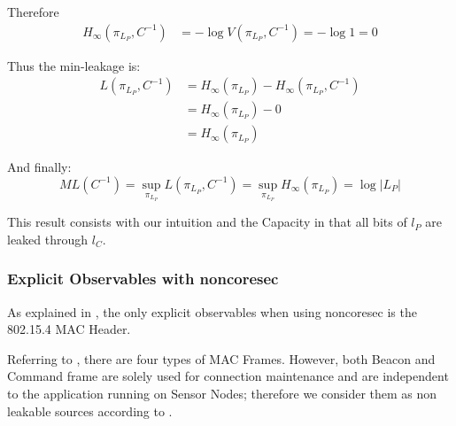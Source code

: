 Therefore
\begin{equation}
	\begin{aligned}
		H_{\infty}(\pi_{L_{P}}, C^{-1})
		 &= - \log{V(\pi_{L_{P}}, C^{-1})} = - \log1= 0
	\end{aligned}
\end{equation}

Thus the min-leakage is:
\begin{equation}
	\begin{aligned}
	L(\pi_{L_P}, C^{-1}) 
	 &= H_{\infty}(\pi_{L_P}) - H_{\infty}(\pi_{L_{P}}, C^{-1}) \\
	 &= H_{\infty}(\pi_{L_P}) - 0 \\
	 &= H_{\infty}(\pi_{L_P})
	\end{aligned}
\end{equation}

And finally:
\begin{equation}
	ML(C^{-1}) = \sup_{\pi_{L_P}}{L(\pi_{L_P},C^{-1})} =  \sup_{\pi_{L_P}} H_{\infty}(\pi_{L_P}) = \log{|L_P|}
\end{equation}

This result consists with our intuition and the Capacity in  that all bits of $l_P$ are leaked through $l_C$.

\subsubsection{Explicit Observables with noncoresec}

As explained in , the only explicit observables when using noncoresec is the 802.15.4 MAC Header. 

Referring to , there are four types of MAC Frames. However, both Beacon and Command frame are solely used for connection maintenance and are independent to the application running on Sensor Nodes; therefore we consider them as non leakable sources according to .

